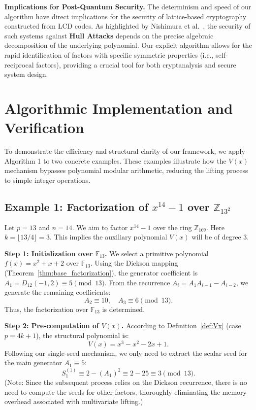 \documentclass[12pt]{article}
\theoremstyle{plain}
\numberwithin{equation}{section}
\begin{document}
\textbf{Implications for Post-Quantum Security.}
The determinism and speed of our algorithm have direct implications for the security of lattice-based cryptography constructed from LCD codes. As highlighted by Nishimura et al.~\cite{Nishimura2025}, the security of such systems against \textbf{Hull Attacks} depends on the precise algebraic decomposition of the underlying polynomial. Our explicit algorithm allows for the rapid identification of factors with specific symmetric properties (i.e., self-reciprocal factors), providing a crucial tool for both cryptanalysis and secure system design.

\section{Algorithmic Implementation and Verification}
\label{sec:examples}

To demonstrate the efficiency and structural clarity of our framework, we apply Algorithm 1 to two concrete examples. These examples illustrate how the $V(x)$ mechanism bypasses polynomial modular arithmetic, reducing the lifting process to simple integer operations.

\subsection{Example 1: Factorization of $x^{14}-1$ over $\mathbb{Z}_{13^2}$}

Let $p=13$ and $n=14$. We aim to factor $x^{14}-1$ over the ring $\mathbb{Z}_{169}$.
Here $k = \lfloor 13/4 \rfloor = 3$. This implies the auxiliary polynomial $V(x)$ will be of degree 3.

\noindent \textbf{Step 1: Initialization over $\mathbb{F}_{13}$.}
We select a primitive polynomial $f(x) = x^2 + x + 2$ over $\mathbb{F}_{13}$.
Using the Dickson mapping (Theorem~\ref{thm:base_factorization}), the generator coefficient is $A_1 = D_{12}(-1, 2) \equiv 5 \pmod{13}$.
From the recurrence $A_i = A_1 A_{i-1} - A_{i-2}$, we generate the remaining coefficients:
\[
A_2 \equiv 10, \quad A_3 \equiv 6 \pmod{13}.
\]
Thus, the factorization over $\mathbb{F}_{13}$ is determined.

\noindent \textbf{Step 2: Pre-computation of $V(x)$.}
According to Definition~\ref{def:Vx} (case $p=4k+1$), the structural polynomial is:
\[
V(x) = x^3 - x^2 - 2x + 1.
\]
Following our single-seed mechanism, we only need to extract the scalar seed for the main generator $A_1 \equiv 5$:
\[
S_1^{(1)} \equiv 2 - (A_1)^2 \equiv 2 - 25 \equiv 3 \pmod{13}.
\]
(Note: Since the subsequent process relies on the Dickson recurrence, there is no need to compute the seeds for other factors, thoroughly eliminating the memory overhead associated with multivariate lifting.)
\end{document}
